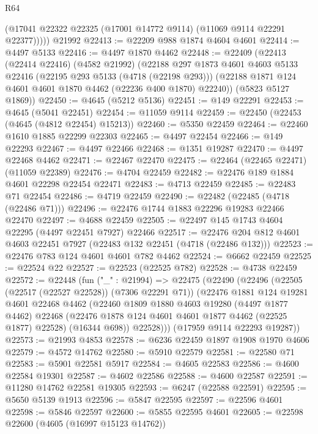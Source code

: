 \begin{lexlean}{R64}
\begin{coremodule}
          (@17041 @22322 @22325 (@17001 @14772 @9114) (@11069 @9114 @22291 @22377)))))
    @21992
@22413 := @22209 @988 @1874 @4604 @4601
@22414 := @4497 @5133
@22416 := @4497 @1870 @4462
@22448 := @22409
    (@22413
      (@22414 @22416)
      (@4582 @21992)
      (@22188
        @297
        @1873
        @4601
        @4603
        @5133
        @22416
        (@22195 @293 @5133 (@4718 (@22198 @293)))
        (@22188 @1871 @124 @4601 @4601 @1870 @4462 (@22236 @400 @1870) @22240))
      (@5823 @5127 @1869))
@22450 := @4645 (@5212 @5136)
@22451 := @149 @22291
@22453 := @4645 (@5041 @22451)
@22454 := @11059 @9114
@22459 := @22450 (@22453 (@4645 (@4812 @22454) @15213))
@22460 := @5350 @22459
@22464 := @22460 @1610 @1885 @22299 @22303
@22465 := @4497 @22454
@22466 := @149 @22293
@22467 := @4497 @22466
@22468 := @1351 @19287
@22470 := @4497 @22468 @4462
@22471 := @22467 @22470
@22475 := @22464 (@22465 @22471) (@11059 @22389)
@22476 := @4704 @22459
@22482 := @22476 @189 @1884 @4601 @22298 @22454 @22471
@22483 := @4713 @22459
@22485 := @22483 @71 @22454
@22486 := @4719 @22459
@22490 := @22482 (@22485 (@4718 (@22486 @71)))
@22496 := @22476 @1744 @1883 @22296 @19283 @22466 @22470
@22497 := @4688 @22459
@22505 := @22497 @145 @1743 @4604 @22295 (@4497 @22451 @7927) @22466
@22517 := @22476 @204 @812 @4601 @4603 @22451 @7927 (@22483 @132 @22451 (@4718 (@22486 @132)))
@22523 := @22476 @783 @124 @4601 @4601 @782 @4462
@22524 := @6662 @22459
@22525 := @22524 @22
@22527 := @22523 (@22525 @782)
@22528 := @4738 @22459
@22572 := @22448
    (fun ("_" : @21994) =>
    @22475
      (@22490
        (@22496
          (@22505 (@22517 (@22527 @22528)) (@7306 @22291 @71))
          (@22476
            @1881
            @124
            @19281
            @4601
            @22468
            @4462
            (@22460
              @1809
              @1880
              @4603
              @19280
              (@4497 @1877 @4462)
              @22468
              (@22476 @1878 @124 @4601 @4601 @1877 @4462 (@22525 @1877) @22528)
              (@16344 @698))
            @22528)))
      (@17959 @9114 @22293 @19287))
@22573 := @21993 @4853
@22578 := @6236 @22459 @1897 @1908 @1970 @4606
@22579 := @4572 @14762
@22580 := @5910 @22579
@22581 := @22580 @71
@22583 := @5901 @22581 @5917
@22584 := @4605 @22583
@22586 := @4600 @22584 @19301
@22587 := @4602 @22586
@22588 := @4600 @22587
@22591 := @11280 @14762 @22581 @19305
@22593 := @6247 (@22588 @22591)
@22595 := @5650 @5139 @1913
@22596 := @5847 @22595
@22597 := @22596 @4601
@22598 := @5846 @22597
@22600 := @5855 @22595 @4601
@22605 := @22598 @22600 (@4605 (@16997 @15123 @14762))

\end{coremodule}
\end{lexlean}
